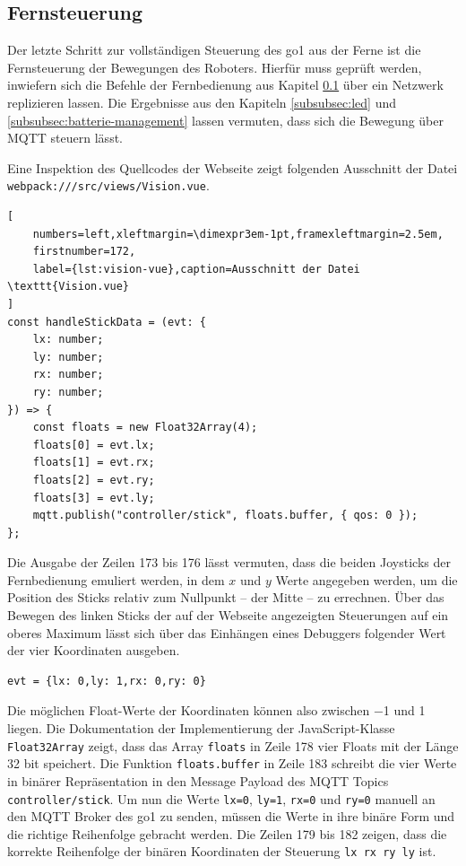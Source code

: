 \subsection{Fernsteuerung}
\label{subsec:fernsteuerung}

Der letzte Schritt zur vollständigen Steuerung des \gls{go1} aus der Ferne ist die Fernsteuerung der Bewegungen des
Roboters.
Hierfür muss geprüft werden, inwiefern sich die Befehle der Fernbedienung aus Kapitel \ref{subsec:fernsteuerung}
über ein Netzwerk replizieren lassen.
Die Ergebnisse aus den Kapiteln \ref{subsubsec:led} und \ref{subsubsec:batterie-management} lassen vermuten, dass sich
die Bewegung über MQTT steuern lässt.


Eine Inspektion des Quellcodes der Webseite zeigt folgenden Ausschnitt der Datei \texttt{webpack\allowbreak :///\allowbreak src/\allowbreak views/\allowbreak Vision.vue}.

\begin{lstlisting}[
    numbers=left,xleftmargin=\dimexpr3em-1pt,framexleftmargin=2.5em,
    firstnumber=172,
    label={lst:vision-vue},caption=Ausschnitt der Datei \texttt{Vision.vue}
]
const handleStickData = (evt: {
    lx: number;
    ly: number;
    rx: number;
    ry: number;
}) => {
    const floats = new Float32Array(4);
    floats[0] = evt.lx;
    floats[1] = evt.rx;
    floats[2] = evt.ry;
    floats[3] = evt.ly;
    mqtt.publish("controller/stick", floats.buffer, { qos: 0 });
};
\end{lstlisting}

Die Ausgabe der Zeilen \num{173} bis \num{176} lässt vermuten, dass die beiden Joysticks der Fernbedienung emuliert werden,
in dem $x$ und $y$ Werte angegeben werden, um die Position des Sticks relativ zum Nullpunkt -- der Mitte -- zu errechnen.
Über das Bewegen des linken Sticks der auf der Webseite angezeigten Steuerungen auf ein oberes Maximum lässt sich über
das Einhängen eines Debuggers folgender Wert der vier Koordinaten ausgeben.

\begin{lstlisting}
evt = {lx: 0,ly: 1,rx: 0,ry: 0}
\end{lstlisting}

\noindent Die möglichen Float-Werte der Koordinaten können also zwischen \num{-1} und \num{1} liegen.
Die Dokumentation der Implementierung der JavaScript-Klasse \texttt{Float32Array} zeigt, dass das Array \texttt{floats}
in Zeile \num{178} vier Floats mit der Länge \num{32} bit speichert.
Die Funktion \texttt{floats.buffer} in Zeile \num{183} schreibt die vier Werte in binärer Repräsentation in den Message
Payload des MQTT Topics \texttt{controller/stick}.
Um nun die Werte \texttt{lx=0}, \texttt{ly=1}, \texttt{rx=0} und \texttt{ry=0} manuell an den MQTT Broker des \gls{go1} zu
senden, müssen die Werte in ihre binäre Form und die richtige Reihenfolge gebracht werden.
Die Zeilen \num{179} bis \num{182} zeigen, dass die korrekte Reihenfolge der binären Koordinaten der Steuerung
\texttt{lx \textrightarrow rx \textrightarrow ry \textrightarrow ly} ist.

